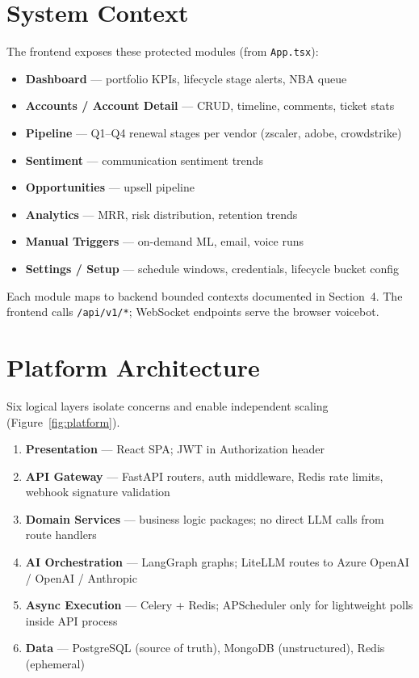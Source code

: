 \documentclass[11pt,a4paper]{article}
\begin{document}
\section{System Context}

The frontend exposes these protected modules (from \texttt{App.tsx}):

\begin{itemize}[leftmargin=1.5em, itemsep=0.2em]
    \item \textbf{Dashboard} --- portfolio KPIs, lifecycle stage alerts, NBA queue
    \item \textbf{Accounts / Account Detail} --- CRUD, timeline, comments, ticket stats
    \item \textbf{Pipeline} --- Q1--Q4 renewal stages per vendor (zscaler, adobe, crowdstrike)
    \item \textbf{Sentiment} --- communication sentiment trends
    \item \textbf{Opportunities} --- upsell pipeline
    \item \textbf{Analytics} --- MRR, risk distribution, retention trends
    \item \textbf{Manual Triggers} --- on-demand ML, email, voice runs
    \item \textbf{Settings / Setup} --- schedule windows, credentials, lifecycle bucket config
\end{itemize}

Each module maps to backend bounded contexts documented in Section~4. The frontend calls \texttt{/api/v1/*}; WebSocket endpoints serve the browser voicebot.

\section{Platform Architecture}

Six logical layers isolate concerns and enable independent scaling (Figure~\ref{fig:platform}).

\begin{enumerate}[leftmargin=1.5em, itemsep=0.3em]
    \item \textbf{Presentation} --- React SPA; JWT in Authorization header
    \item \textbf{API Gateway} --- FastAPI routers, auth middleware, Redis rate limits, webhook signature validation
    \item \textbf{Domain Services} --- business logic packages; no direct LLM calls from route handlers
    \item \textbf{AI Orchestration} --- LangGraph graphs; LiteLLM routes to Azure OpenAI / OpenAI / Anthropic
    \item \textbf{Async Execution} --- Celery + Redis; APScheduler only for lightweight polls inside API process
    \item \textbf{Data} --- PostgreSQL (source of truth), MongoDB (unstructured), Redis (ephemeral)
\end{enumerate}
\end{document}
